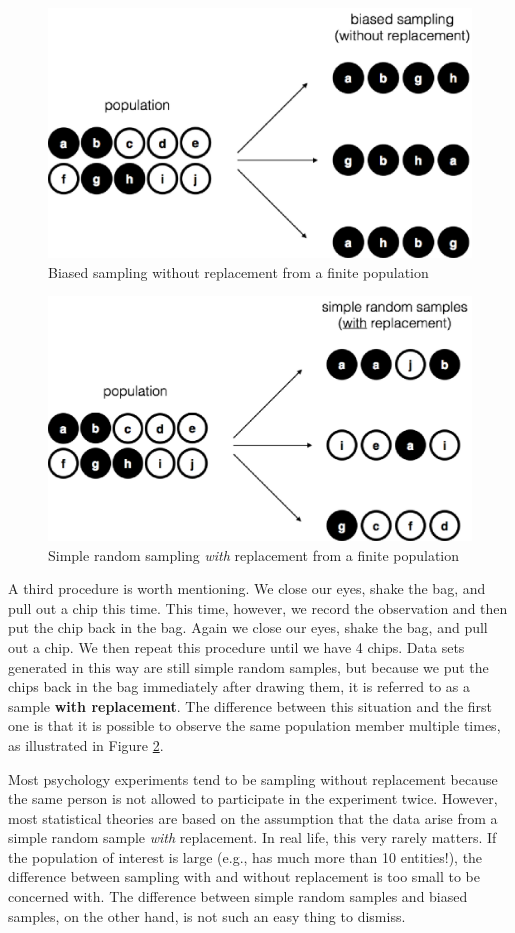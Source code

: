 \documentclass[
  11pt,
  a4paper,
  twoside,symmetric,openright]{book}
\theoremstyle{break}
\theoremstyle{break}
\begin{document}
\begin{figure}

{\centering \includegraphics[width=0.6\linewidth]{resources/image/brs} 

}

\caption{Biased sampling without replacement from a finite population}\label{fig:brs}
\end{figure}



\begin{figure}

{\centering \includegraphics[width=0.6\linewidth]{resources/image/srs2} 

}

\caption{Simple random sampling \emph{with} replacement from a finite population}\label{fig:srs2}
\end{figure}

A third procedure is worth mentioning. We close our eyes, shake the bag, and pull out a chip this time. This time, however, we record the observation and then put the chip back in the bag. Again we close our eyes, shake the bag, and pull out a chip. We then repeat this procedure until we have 4 chips. Data sets generated in this way are still simple random samples, but because we put the chips back in the bag immediately after drawing them, it is referred to as a sample \textbf{with replacement}. The difference between this situation and the first one is that it is possible to observe the same population member multiple times, as illustrated in Figure \ref{fig:srs2}.

Most psychology experiments tend to be sampling without replacement because the same person is not allowed to participate in the experiment twice. However, most statistical theories are based on the assumption that the data arise from a simple random sample \emph{with} replacement. In real life, this very rarely matters. If the population of interest is large (e.g., has much more than 10 entities!), the difference between sampling with and without replacement is too small to be concerned with. The difference between simple random samples and biased samples, on the other hand, is not such an easy thing to dismiss.
\end{document}

